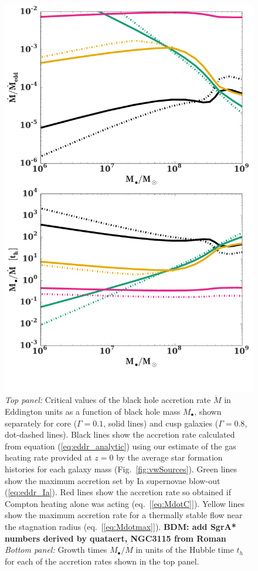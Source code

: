 \documentclass[usenatbib,fleqn]{mn2e}
\newcommand{\Mdot}{\dot{M}}
\newcommand{\Mbh}[1][]{M_{\bullet#1}}
\renewcommand{\th}{t_h}
\begin{document}
\begin{figure}
\includegraphics[width=\columnwidth]{mdot_sfr.pdf}
\caption{\label{fig:bh_growth} {\it Top panel:} Critical values of the
  black hole accretion rate $\dot{M}$ in Eddington units as a function
  of black hole mass $M_{\bullet}$, shown separately for core
  ($\Gamma=0.1$, solid lines) and cusp galaxies ($\Gamma=0.8$,
  dot-dashed lines).  Black lines show the accretion rate calculated
  from equation (\ref{eq:eddr_analytic}) using our estimate of the gas
  heating rate provided at $z = 0$ by the average star formation
  histories for each galaxy mass (Fig.~\ref{fig:vwSources}).  Green
  lines show the maximum accretion set by Ia supernovae blow-out
  (\ref{eq:eddr_Ia}).  Red lines show the accretion rate so obtained
  if Compton heating alone was acting (eq.~[\ref{eq:MdotC}]).  Yellow
  lines show the maximum accretion rate for a thermally stable flow
  near the stagnation radius (eq.~[\ref{eq:Mdotmax}]).  {\bf BDM: add
    SgrA* numbers derived by quataert, NGC3115 from Roman} {\it Bottom
    panel:} Growth times $\Mbh/\Mdot$ in units of the Hubble time
  $\th$ for each of the accretion rates shown in the top panel.}
\end{figure}
\end{document}
